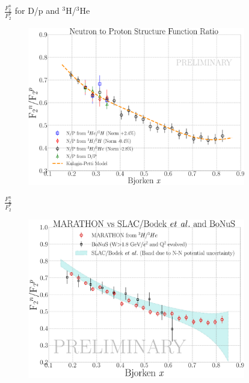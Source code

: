 \documentclass[12pt]{beamer}
\begin{document}
\begin{frame}{$\frac{F_2^n}{F_2^p}$ for D/p and $^3$H/$^3$He}
\vspace{-20pt}
\begin{figure}
	\includegraphics[width=9.5cm]{../images/MARA_F2_1.pdf}
\end{figure}
\end{frame}

\begin{frame}{$\frac{F_2^n}{F_2^p}$}
\vspace{-20pt}
\begin{figure}
	\includegraphics[width=9.5cm]{../images/MARA_F2.pdf}
\end{figure}
\end{frame}
\end{document}
